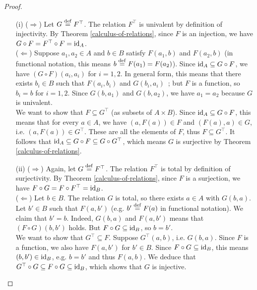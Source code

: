 \begin{proof}
	\begin{itemize}
		\item[(i)] ($\Rightarrow$) Let $G \overset{\mathrm{def}}{=} F^{\top}$. The relation $F^{\top}$ is univalent by definition of injectivity. By Theorem \autoref{calculus-of-relations}, since $F$ is an injection, we have $G \circ F = F^{\top} \circ F = \operatorname{\mathrm{id}}_{A}$.
		\\

		($\Leftarrow$) Suppose $a_1,a_2 \in A$ and $b \in B$ satisfy $F(a_1,b)$ and $F(a_2,b)$ (in functional notation, this means $b \overset{\mathrm{def}}{=} F(a_1) = F(a_2)$). Since $\operatorname{\mathrm{id}}_{A} \subseteq G \circ F$, we have $(G \circ F)(a_i,a_i)$ for $i=1,2$. In general form, this means that there exists $b_i \in B$ such that $F(a_i,b_i)$ and $G(b_i,a_i)$~; but $F$ is a function, so $b_i = b$ for $i=1,2$. Since $G(b,a_1)$ and $G(b,a_2)$, we have $a_1 = a_2$ because $G$ is univalent.
		\\

		We want to show that $F \subseteq G^{\top}$ (as subsets of $A \times B$). Since $\operatorname{\mathrm{id}}_{A} \subseteq G \circ F$, this means that for every $a \in A$, we have $(a,F(a)) \in F$ and $(F(a), a) \in G$, i.e. $(a, F(a)) \in G^{\top}$. These are all the elements of $F$, thus $F \subseteq G^{\top}$. It follows that $\operatorname{\mathrm{id}}_{A} \subseteq G \circ F \subseteq G \circ G^{\top}$, which means $G$ is surjective by Theorem \autoref{calculus-of-relations}.
		\\

		\item[(ii)] ($\Rightarrow$) Again, let $G \overset{\mathrm{def}}{=} F^{\top}$. The relation $F^{\top}$ is total by definition of surjectivity. By Theorem \autoref{calculus-of-relations}, since $F$ is a surjection, we have $F \circ G = F \circ F^{\top} = \operatorname{\mathrm{id}}_{B}$. 
		\\

		($\Leftarrow$) Let $b \in B$. The relation $G$ is total, so there exists $a \in A$ with $G(b,a)$. Let $b' \in B$ such that $F(a,b')$ (e.g. $b' \overset{\mathrm{def}}{=} F(a)$ in functional notation). We claim that $b' = b$. Indeed, $G(b,a)$ and $F(a,b')$ means that $(F \circ G)(b,b')$ holds. But $F \circ G \subseteq \operatorname{\mathrm{id}}_{B}$, so $b=b'$. 
		\\

		We want to show that $G^{\top} \subseteq F$. Suppose $G^{\top}(a,b)$, i.e. $G(b,a)$. Since $F$ is a function, we also have $F(a,b')$ for $b' \in B$. Since $F \circ G \subseteq \operatorname{\mathrm{id}}_{B}$, this means $(b,b') \in \operatorname{\mathrm{id}}_{B}$, e.g. $b=b'$ and thus $F(a,b)$. We deduce that $G^{\top} \circ G \subseteq F \circ G \subseteq \operatorname{\mathrm{id}}_{B}$, which shows that $G$ is injective.
		\\


\end{itemize}
\end{proof}
